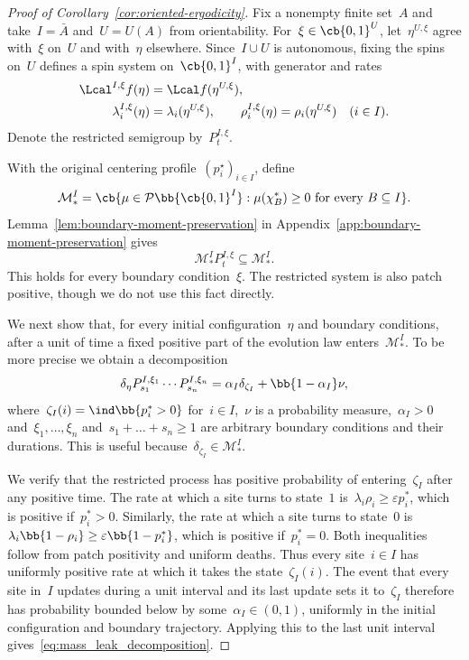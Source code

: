 \begin{proof}[Proof of Corollary~\ref{cor:oriented-ergodicity}]
    

Fix a nonempty finite set~$A$ and take~$I=\bar A$ and~$U=U(A)$ from
orientability. For~$\xi\in\cb{0,1}^U$, let~$\eta^{U,\xi}$ agree with~$\xi$
on~$U$ and with~$\eta$ elsewhere. Since~$I\cup U$ is autonomous, fixing
the spins on~$U$ defines a spin system on~$\cb{0,1}^I$, with generator
and rates
\begin{align*}
\Lcal^{I,\xi}f(\eta)&=\Lcal f(\eta^{U,\xi}),\\
\lambda_i^{I,\xi}(\eta)&=\lambda_i(\eta^{U,\xi}),
\qquad
\rho_i^{I,\xi}(\eta)=\rho_i(\eta^{U,\xi})
\quad(i\in I).
\end{align*}
Denote the restricted semigroup by~$P_t^{I,\xi}$.

With the original centering profile~$(p_i^\star)_{i\in I}$, define
\begin{equation*}
\mathcal M_*^I
=\cb{\mu\in\mathcal P\bb{\cb{0,1}^I}:
       \mu(\chi_B^*)\geq0\text{ for every }B\subseteq I}.
\end{equation*}
Lemma~\ref{lem:boundary-moment-preservation} in
Appendix~\ref{app:boundary-moment-preservation} gives
\begin{equation*}
\mathcal M_*^I P_t^{I,\xi}\subseteq\mathcal M_*^I.
\end{equation*}
This holds for every boundary condition~$\xi$. The restricted system is also patch positive, though we do not use this fact directly.

We next show that, for every initial configuration~$\eta$ and boundary conditions, after a unit of time a fixed positive part of the evolution law enters~$\mathcal{M}_*^I$. To be more precise we obtain a decomposition
\begin{equation}\label{eq:mass_leak_decomposition}
    \delta_\eta P_{s_1}^{I,\xi_1}\cdots P_{s_n}^{I,\xi_n} = \alpha_I \delta_{\zeta_I} + \bb{1-\alpha_I}\nu,
\end{equation}
where~$\zeta_I(i) = \ind\bb{p_i^* > 0}$ for~$i\in I$,~$\nu$ is a probability measure,~$\alpha_I>0$ and~$\xi_1,\dots,\xi_n$ and~$s_1+\dots +s_n\geq 1$ are arbitrary boundary conditions and their durations. This is useful because~$\delta_{\zeta_I}\in\mathcal{M}_*^I$.

We verify that the restricted process has positive probability of entering~$\zeta_I$ after any positive time. The rate at which a site turns to state~$1$ is~$\lambda_i\rho_i  \geq \varepsilon p_i^*$, which is positive if~$p_i^*>0$. Similarly, the rate at which a site turns to state~$0$ is~$\lambda_i\bb{1 - \rho_i}\geq \varepsilon \bb{1-p_i^*}$, which is positive if~$p_i^* = 0$. Both inequalities follow from patch positivity and uniform deaths. Thus every site~$i\in I$ has uniformly positive rate at which it takes the state~$\zeta_I(i)$. The event that every site in~$I$ updates during a unit interval and its last update sets it to~$\zeta_I$ therefore has probability bounded below by some~$\alpha_I\in(0,1)$, uniformly in the initial configuration and boundary trajectory. Applying this to the last unit interval gives~\eqref{eq:mass_leak_decomposition}.


\end{proof}

